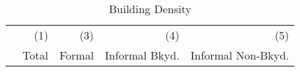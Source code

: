 \documentclass[12pt]{article}
\begin{document}







% 
% 





\begin{table}
\caption{Building Density}
\begin{tabular}{lDDDD}
\toprule
 & \small (1)  & \small (3) & \small (4) & \small (5) \\
 & Total & Formal   & Informal Bkyd. & Informal Non-Bkyd. \\ \midrule

\midrule

\bottomrule
\end{tabular}
\end{table}
\end{document}
